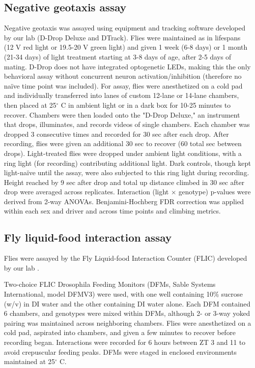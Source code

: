 \subsection*{Negative geotaxis assay}

Negative geotaxis was assayed using equipment and tracking software developed by our lab (D-Drop Deluxe and DTrack).
Flies were maintained as in lifespans (12 V red light or 19.5-20 V green light) and given 1 week (6-8 days) or 1 month (21-34 days) of light treatment starting at 3-8 days of age, after 2-5 days of mating. 
D-Drop does not have integrated optogenetic LEDs, making this the only behavioral assay without concurrent neuron activation/inhibition (therefore no naïve time point was included). 
For assay, flies were anesthetized on a cold pad and individually transferred into lanes of custom 12-lane or 14-lane chambers, then placed at 25$^{\circ}$ C in ambient light or in a dark box for 10-25 minutes to recover.
Chambers were then loaded onto the "D-Drop Deluxe," an instrument that drops, illuminates, and records videos of single chambers. 
Each chamber was dropped 3 consecutive times and recorded for 30 sec after each drop.
After recording, flies were given an additional 30 sec to recover (60 total sec between drops).
Light-treated flies were dropped under ambient light conditions, with a ring light (for recording) contributing additional light. 
Dark controls, though kept light-naïve until the assay, were also subjected to this ring light during recording.
Height reached by 9 sec after drop and total up distance climbed in 30 sec after drop were averaged across replicates. 
Interaction (light $\times$ genotype) p-values were derived from 2-way ANOVAs. 
Benjamini-Hochberg FDR correction was applied within each sex and driver and across time points and climbing metrics.

\subsection*{Fly liquid-food interaction assay}

Flies were assayed by the Fly Liquid-food Interaction Counter (FLIC) developed by our lab \citep{ro2014}. 

Two-choice FLIC Drosophila Feeding Monitors (DFMs, Sable Systems International, model DFMV3) were used, with one well containing 10\% sucrose (w/v) in DI water and the other containing DI water alone. 
Each DFM contained 6 chambers, and genotypes were mixed within DFMs, although 2- or 3-way yoked pairing was maintained across neighboring chambers.
Flies were anesthetized on a cold pad, aspirated into chambers, and given a few minutes to recover before recording began. 
Interactions were recorded for 6 hours between ZT 3 and 11 to avoid crepuscular feeding peaks.
DFMs were staged in enclosed environments maintained at 25$^{\circ}$ C.

